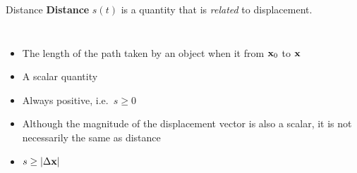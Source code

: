 \documentclass[12pt,compress,aspectratio=169]{beamer}
\newcommand{\mb}[1]{\ensuremath\mathbf{#1}}
\newcommand{\eq}[2]{\vspace{#1}{\Large\begin{displaymath}#2\end{displaymath}}}
\begin{document}
\begin{frame}{Distance}
  \textbf{Distance} $s(t)$ is a quantity that is \emph{related} to displacement.
  \begin{columns}
    \begin{itemize}
    \item The length of the path taken by an object when it from $\mb{x}_0$ to
      $\mb{x}$
    \item A scalar quantity
    \item Always positive, i.e.\ $s\geq 0$
    \item Although the magnitude of the displacement vector is also a scalar,
      it is not necessarily the same as distance
    \item $s\geq |\Delta\mb{x}|$
    \end{itemize}
    
  \end{columns}
\end{frame}




%
%
%
%  
%  
%
\end{document}
